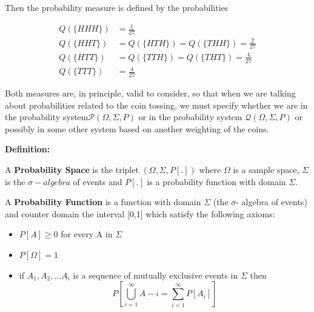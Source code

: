 \documentclass[12pt]{article}
\begin{document}
Then the probability measure is defined by the probabilities

\begin{align} 
Q(\{HHH\}) &=\frac{1}{27} \\ 
Q(\{HHT\}) &=Q(\{HTH\})=Q(\{THH\})=\frac{2}{27}   \\
Q(\{HTT\}) &=Q(\{TTH\})=Q(\{THT\})=\frac{4}{27}   \\
Q(\{TTT\}) &=\frac{4}{27} 
\end{align}

Both measures are, in principle, valid to consider, so that when we are talking about probabilities related to the coin tossing, we must specify whether we are in the probability system$\mathcal{P}(\Omega, \Sigma, P)$ or in the probability system $\mathcal{Q}(\Omega, \Sigma, P)$ or possibly in some other system based on another weighting of the coins.

\textbf{Definition:}

A \textbf{Probability Space} is the triplet $(\Omega,\Sigma,P[.])$ where $\Omega$ is a sample space, $\Sigma$ is the $\sigma-algebra$ of events and $P[.]$ is a probability function with domain $\Sigma$.

A \textbf{Probability Function} is a function with domain $\Sigma$ (the $\sigma$- algebra of events) and counter domain the interval [0,1] which satisfy the following axioms:

\begin{itemize}
	\item $P[A]\geq0$ for every A in $\Sigma$
	\item $P[\Omega]=1$
	\item if $A_{1},A_{2}, \dots A_{i}$ is a sequence of mutually exclusive events in $\Sigma$ then
	\begin{equation}
		P[\bigcup^{\infty}_{i=1}A-{i}=\sum^{\infty}_{i=1}P[A_{i}]]
	\end{equation} 
\end{itemize}
\end{document}
